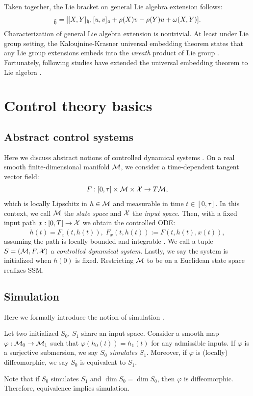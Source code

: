 Taken together, the Lie bracket on general Lie algebra extension follows:
\begin{equation*}
    [(X, u), (Y, v)]_{\tilde{\fr{h}}} = [[X,Y]_\fr{h}, [u,v]_\fr{a} + \rho(X)v - \rho(Y)u + \omega(X,Y)].
\end{equation*}
Characterization of general Lie algebra extension is nontrivial.
At least under Lie group setting, the Kaloujnine-Krasner universal embedding theorem states that
any Lie group extensions embeds into the \emph{wreath} product of Lie group \cite{wells1976some,deval2024universal}.
Fortunately, following studies have extended the universal embedding theorem
to Lie algebra \cite{petrogradsky2007wreath, deval2024universal}.
\section{Control theory basics}
\label{app:LPV}
\subsection{Abstract control systems}
\label{app:control_detail}
Here we discuss abstract notions of controlled dynamical systems \cite{iserles2000lie}.
On a real smooth finite-dimensional manifold $\mathcal{M}$, we consider a time-dependent tangent vector field:
\begin{equation*}
    F: [0,\tau] \times \mathcal{M} \times \mathcal{X} \to T\mathcal{M},
\end{equation*}
which is locally Lipschitz in $h \in \mathcal{M}$ and measurable in time $t \in [0,\tau]$.  
In this context, we call $\mathcal{M}$ the \emph{state space} and $\mathcal{X}$ the \emph{input space}.
Then, with a fixed input path $x: [0,T] \to \mathcal{X}$ we obtain the controlled ODE:
\begin{equation}
    \label{eq:abstractODE}
    \dot{h}(t) = F_x(t,h(t)), \; F_x(t,h(t)) := F(t,h(t),x(t)),
\end{equation}
assuming the path is locally bounded and integrable \cite{iserles2000lie}.
We call a tuple $S = (\mathcal{M}, F,\mathcal{X})$ a \emph{controlled dynamical system}.
Lastly, we say the system is initialized when $h(0)$ is fixed.
Restricting $\mathcal{M}$ to be on a Euclidean state space realizes SSM.
\subsection{Simulation}
\label{app:sim_detail}
Here we formally introduce the notion of simulation \cite{sussmann1976existence,hermann1977nonlinear, krener1977decomposition}.
\begin{definition}[Simulation]
\label{def:SSM_sim_equivalence}
    Let two initialized $S_0$, $S_1$ share an input space.
    Consider a smooth map $\varphi: \mathcal{M}_0 \to \mathcal{M}_1$
    such that $\varphi(h_0(t)) = h_1(t)$ for any admissible inputs.
    If $\varphi$ is a surjective submersion, we say $S_0$ \emph{simulates} $S_1$.
    Moreover, if $\varphi$ is (locally) diffeomorphic, we say $S_0$ is equivalent to $S_1$.
\end{definition}
Note that if $S_0$ simulates $S_1$ and $\dim S_0 = \dim S_0$,
then $\varphi$ is diffeomorphic.
Therefore, equivalence implies simulation.

